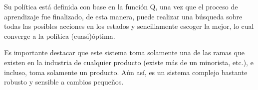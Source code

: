 
Su pol\'itica est\'a definida con base en la funci\'on Q, una vez que el proceso de aprendizaje fue finalizado, de esta manera, puede realizar una b\'usqueda sobre todas las posibles acciones en los estados y sencillamente escoger la mejor, lo cual converge a la pol\'itica (cuasi)\'optima. 

Es importante destacar que este sistema toma solamente una de las ramas que existen en la industria de cualquier producto (existe m\'as de un minorista, etc.), e incluso, toma solamente un producto. A\'un as\'i, es un sistema complejo bastante robusto y sensible a cambios peque\~nos.